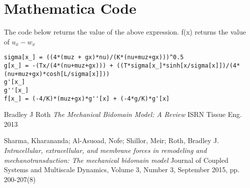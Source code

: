 \documentclass[a4paper,oneside,11pt]{report}
\begin{document}
\section*{Mathematica Code}
The code below returns the value of the above expression. f(x) returns the value of $u_x - w_x$
\begin{lstlisting}
sigma[x_] = ((4*(muz + gx)*nu)/(K*(nu+muz+gx)))^0.5
g[x_] = -(Tx/(4*(nu+muz+gx))) + ((T*sigma[x_]*sinh[x/sigma[x]])/(4*(nu+muz+gx)*cosh[L/sigma[x]]))
g'[x_]
g''[x_]
f[x_] = (-4/K)*(muz+gx)*g''[x] + (-4*g/K)*g'[x] 
\end{lstlisting}
\begin{thebibliography}{9}
	Bradley J Roth
	\textit{The Mechanical Bidomain Model: A Review}
	ISRN Tissue Eng. 2013
	
	 Sharma, Kharananda; Al-Asuoad, Nofe; Shillor, Meir; Roth, Bradley J.
	\textit{Intracellular, extracellular, and membrane forces in remodeling and mechanotransduction: The mechanical bidomain model}
	Journal of Coupled Systems and Multiscale Dynamics, Volume 3, Number 3, September 2015, pp. 200-207(8)
\end{thebibliography}
\end{document}
